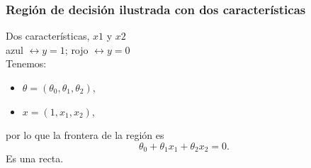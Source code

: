 \documentclass{beamer}
\begin{document}
  \begin{frame}\frametitle{Región de decisión ilustrada con dos características}
 \begin{minipage}[t][5cm][t]{5.5cm}
          \end{minipage}
       \begin{minipage}[t][5cm][t]{4.5cm}
         \footnotesize
     Dos características, $x1$ y $x2$\\
     azul $\leftrightarrow y=1$; rojo $\leftrightarrow y=0$\\
     Tenemos: 
     \begin{itemize}
     \item $\theta=(\theta_0,\theta_1,\theta_2)$,
     \item $x=(1,x_1,x_2)$,
     \end{itemize}
     por lo que la frontera de la región es $$\theta_0+\theta_1x_1+\theta_2x_2=0.$$ Es una recta.
     \end{minipage}\\

 \end{frame}
\end{document}
